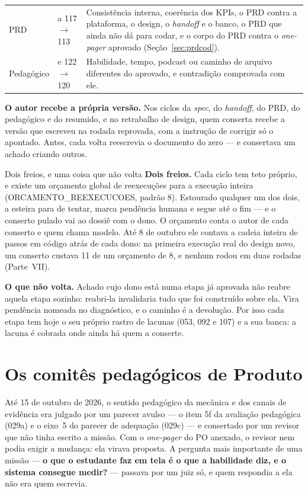 \documentclass[11pt,a4paper]{article}
\newcommand{\cod}[1]{{\ttfamily\small #1}}
\begin{document}
\begin{center}
\begin{longtable}{>{\raggedright\arraybackslash}p{2.3cm}>{\raggedright\arraybackslash}p{4.0cm}p{8.3cm}}
\addlinespace
PRD & 114 a 117 $\rightarrow$ 113 & Consistência interna, coerência dos KPIs, o PRD contra a plataforma, o design, o \emph{handoff} e o banco, o PRD que ainda não dá para codar, e o corpo do PRD contra o \emph{one-pager} aprovado (Seção~\ref{sec:prdcod}). \\
\addlinespace
Pedagógico & 121 e 122 $\rightarrow$ 120 & Habilidade, tempo, podcast ou caminho de arquivo diferentes do aprovado, e contradição comprovada com ele. \\
\bottomrule
\end{longtable}
\end{center}

\textbf{O autor recebe a própria versão.} Nos ciclos da \emph{spec}, do \emph{handoff}, do PRD, do pedagógico e do resumido, e no retrabalho de design, quem conserta recebe a versão que escreveu na rodada reprovada, com a instrução de corrigir só o apontado. Antes, cada volta reescrevia o documento do zero --- e consertava um achado criando outros.

\begin{caixaGuardrail}{Dois freios, e uma coisa que não volta}
\textbf{Dois freios.} Cada ciclo tem teto próprio, e existe um orçamento global de reexecuções para a execução inteira (\cod{ORCAMENTO\_REEXECUCOES}, padrão 8). Estourado qualquer um dos dois, a esteira para de tentar, marca pendência humana e segue até o fim --- e o conserto pulado vai ao dossiê com o dono. O orçamento conta o autor de cada conserto e quem chama modelo. Até 8 de outubro ele contava a cadeia inteira de passos em código atrás de cada dono: na primeira execução real do design novo, um conserto custava 11 de um orçamento de 8, e nenhum rodou em duas rodadas (Parte~VII).

\textbf{O que não volta.} Achado cujo dono está numa etapa já aprovada não reabre aquela etapa sozinho: reabri-la invalidaria tudo que foi construído sobre ela. Vira pendência nomeada no diagnóstico, e o caminho é a devolução. Por isso cada etapa tem hoje o seu próprio rastro de lacunas (053, 092 e 107) e a sua banca: a lacuna é cobrada onde ainda há quem a conserte.
\end{caixaGuardrail}

\section{Os comitês pedagógicos de Produto}
\label{sec:comites}

Até 15 de outubro de 2026, o sentido pedagógico da mecânica e dos canais de evidência era julgado por um parecer avulso --- o item 5f da avaliação pedagógica (029a) e o eixo~5 do parecer de adequação (029c) --- e consertado por um revisor que não tinha escrito a missão. Com o \emph{one-pager} do PO anexado, o revisor nem podia exigir a mudança: ela virava proposta. A pergunta mais importante de uma missão --- \textbf{o que o estudante faz em tela é o que a habilidade diz, e o sistema consegue medir?} --- passava por um juiz só, e quem respondia a ela não era quem escrevia.
\end{document}
